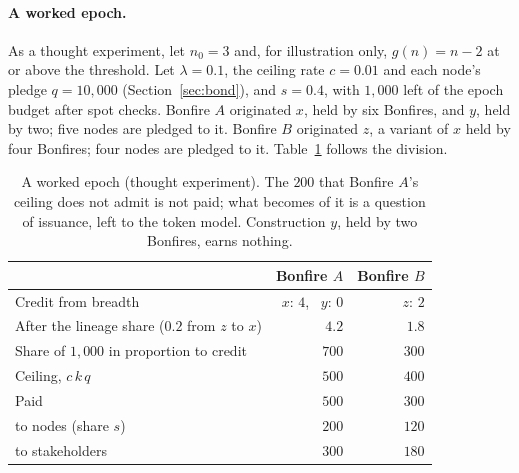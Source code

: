 \paragraph{A worked epoch.} As a thought experiment, let $n_0 = 3$ and, for illustration only, $g(n) = n - 2$ at
or above the threshold. Let $\lambda = 0.1$, the ceiling rate $c = 0.01$ and each node's pledge $q = 10{,}000$ (Section~\ref{sec:bond}), and $s = 0.4$, with $1{,}000$ left of the epoch budget after spot checks. Bonfire $A$ originated $x$, held by six
Bonfires, and $y$, held by two; five nodes are pledged to it. Bonfire $B$ originated $z$, a variant of $x$ held by
four Bonfires; four nodes are pledged to it. Table~\ref{tab:epoch} follows the division.

\begin{table}[!htb]
\centering\small
\begin{tabular}{@{}lrr@{}}
\toprule
 & \textbf{Bonfire $A$} & \textbf{Bonfire $B$} \\
\midrule
Credit from breadth & $x$: $4$, \ $y$: $0$ & $z$: $2$ \\
After the lineage share ($0.2$ from $z$ to $x$) & $4.2$ & $1.8$ \\
Share of $1{,}000$ in proportion to credit & $700$ & $300$ \\
Ceiling, $c\,k\,q$ & $500$ & $400$ \\
Paid & $500$ & $300$ \\
\quad to nodes (share $s$) & $200$ & $120$ \\
\quad to stakeholders & $300$ & $180$ \\
\bottomrule
\end{tabular}
\caption{A worked epoch (thought experiment). The $200$ that Bonfire $A$'s ceiling does not admit is not paid;
what becomes of it is a question of issuance, left to the token model. Construction $y$, held by two Bonfires,
earns nothing.}\label{tab:epoch}
\end{table}

